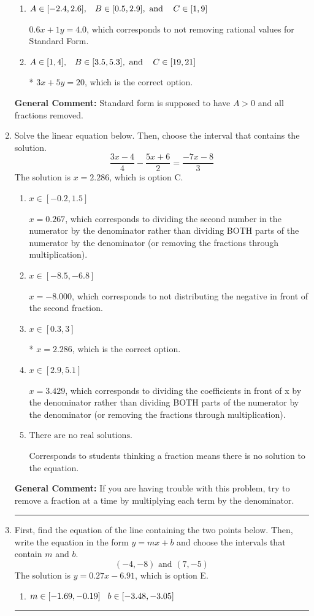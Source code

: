 \documentclass{extbook}[14pt]
\newcommand{\litem}[1]{\item #1

\rule{\textwidth}{0.4pt}}
\begin{document}
\begin{enumerate}
{\begin{enumerate}[label=\Alph*.]
 $0.6x - 1y = -4.0$, which corresponds to using the opposite (negative) slope of the graph and not removing rational values.
\item \( A \in [-2.4, 2.6], \hspace{3mm} B \in [0.5, 2.9], \text{ and } \hspace{3mm} C \in [1, 9] \)

 $0.6x + 1y = 4.0$, which corresponds to not removing rational values for Standard Form.
\item \( A \in [1, 4], \hspace{3mm} B \in [3.5, 5.3], \text{ and } \hspace{3mm} C \in [19, 21] \)

* $3x + 5y = 20$, which is the correct option.
\end{enumerate}

\textbf{General Comment:} Standard form is supposed to have $A > 0$ and all fractions removed.
}
\litem{
Solve the linear equation below. Then, choose the interval that contains the solution.
\[ \frac{3x -4}{4} - \frac{5x + 6}{2} = \frac{-7x -8}{3} \]The solution is \( x = 2.286 \), which is option C.\begin{enumerate}[label=\Alph*.]
\item \( x \in [-0.2, 1.5] \)

 $x = 0.267$, which corresponds to dividing the second number in the numerator by the denominator rather than dividing BOTH parts of the numerator by the denominator (or removing the fractions through multiplication).
\item \( x \in [-8.5, -6.8] \)

 $x = -8.000$, which corresponds to not distributing the negative in front of the second fraction.
\item \( x \in [0.3, 3] \)

* $x = 2.286$, which is the correct option.
\item \( x \in [2.9, 5.1] \)

 $x = 3.429$, which corresponds to dividing the coefficients in front of x by the denominator rather than dividing BOTH parts of the numerator by the denominator (or removing the fractions through multiplication).
\item \( \text{There are no real solutions.} \)

Corresponds to students thinking a fraction means there is no solution to the equation.
\end{enumerate}

\textbf{General Comment:} If you are having trouble with this problem, try to remove a fraction at a time by multiplying each term by the denominator.
}
\litem{
First, find the equation of the line containing the two points below. Then, write the equation in the form $ y=mx+b $ and choose the intervals that contain $m$ and $b$.
\[ (-4, -8) \text{ and } (7, -5) \]The solution is \( y = 0.27x -6.91 \), which is option E.\begin{enumerate}[label=\Alph*.]
\item \( m \in [-1.69, -0.19] \hspace*{3mm} b \in [-3.48, -3.05] \)


\end{enumerate}}
\end{enumerate}
\end{document}
